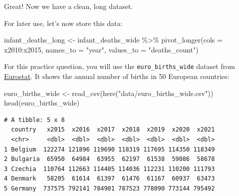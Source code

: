 \documentclass[
  letterpaper,
  DIV=11,
  numbers=noendperiod]{scrreprt}
\newenvironment{Shaded}{\begin{snugshade}}{\end{snugshade}}
\newcommand{\AttributeTok}[1]{\textcolor[rgb]{0.40,0.45,0.13}{#1}}
\newcommand{\FunctionTok}[1]{\textcolor[rgb]{0.28,0.35,0.67}{#1}}
\newcommand{\NormalTok}[1]{\textcolor[rgb]{0.00,0.23,0.31}{#1}}
\newcommand{\OtherTok}[1]{\textcolor[rgb]{0.00,0.23,0.31}{#1}}
\newcommand{\SpecialCharTok}[1]{\textcolor[rgb]{0.37,0.37,0.37}{#1}}
\newcommand{\StringTok}[1]{\textcolor[rgb]{0.13,0.47,0.30}{#1}}
\begin{document}
Great! Now we have a clean, long dataset.

For later use, let's now store this data:

\begin{Shaded}
\begin{Highlighting}[]
\NormalTok{infant\_deaths\_long }\OtherTok{\textless{}{-}} 
\NormalTok{  infant\_deaths\_wide }\SpecialCharTok{\%\textgreater{}\%} 
  \FunctionTok{pivot\_longer}\NormalTok{(}\AttributeTok{cols =}\NormalTok{ x2010}\SpecialCharTok{:}\NormalTok{x2015,}
               \AttributeTok{names\_to =} \StringTok{"year"}\NormalTok{, }
               \AttributeTok{values\_to =} \StringTok{"deaths\_count"}\NormalTok{)}
\end{Highlighting}
\end{Shaded}

\begin{tcolorbox}[enhanced jigsaw, title=\textcolor{quarto-callout-tip-color}{\faLightbulb}\hspace{0.5em}{Practice}, colbacktitle=quarto-callout-tip-color!10!white, leftrule=.75mm, arc=.35mm, opacityback=0, bottomrule=.15mm, rightrule=.15mm, toptitle=1mm, breakable, toprule=.15mm, colback=white, coltitle=black, colframe=quarto-callout-tip-color-frame, bottomtitle=1mm, titlerule=0mm, left=2mm, opacitybacktitle=0.6]

For this practice question, you will use the \texttt{euro\_births\_wide}
dataset from
\href{https://ec.europa.eu/eurostat/databrowser/view/tps00204/default/table}{Eurostat}.
It shows the annual number of births in 50 European countries:

\begin{Shaded}
\begin{Highlighting}[]
\NormalTok{euro\_births\_wide }\OtherTok{\textless{}{-}} 
  \FunctionTok{read\_csv}\NormalTok{(}\FunctionTok{here}\NormalTok{(}\StringTok{"data/euro\_births\_wide.csv"}\NormalTok{))}
\FunctionTok{head}\NormalTok{(euro\_births\_wide)}
\end{Highlighting}
\end{Shaded}

\begin{verbatim}
# A tibble: 5 x 8
  country   x2015  x2016  x2017  x2018  x2019  x2020  x2021
  <chr>     <dbl>  <dbl>  <dbl>  <dbl>  <dbl>  <dbl>  <dbl>
1 Belgium  122274 121896 119690 118319 117695 114350 118349
2 Bulgaria  65950  64984  63955  62197  61538  59086  58678
3 Czechia  110764 112663 114405 114036 112231 110200 111793
4 Denmark   58205  61614  61397  61476  61167  60937  63473
5 Germany  737575 792141 784901 787523 778090 773144 795492
\end{verbatim}


\end{tcolorbox}
\end{document}
